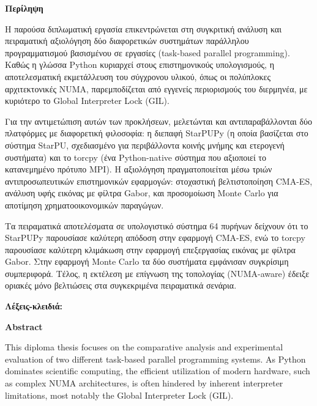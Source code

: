 \pagestyle{plain}
\begin{center}
{\LARGE \textbf{Περίληψη}}\\[1cm]
\end{center}

Η παρούσα διπλωματική εργασία επικεντρώνεται στη συγκριτική ανάλυση και πειραματική αξιολόγηση δύο διαφορετικών συστημάτων παράλληλου προγραμματισμού βασισμένου σε εργασίες (task-based parallel programming). Καθώς η γλώσσα Python κυριαρχεί στους επιστημονικούς υπολογισμούς, η αποτελεσματική εκμετάλλευση του σύγχρονου υλικού, όπως οι πολύπλοκες αρχιτεκτονικές NUMA, παρεμποδίζεται από εγγενείς περιορισμούς του διερμηνέα, με κυριότερο το Global Interpreter Lock (GIL).

Για την αντιμετώπιση αυτών των προκλήσεων, μελετώνται και αντιπαραβάλλονται δύο πλατφόρμες με διαφορετική φιλοσοφία: η διεπαφή StarPUPy (η οποία βασίζεται στο σύστημα StarPU, σχεδιασμένο για περιβάλλοντα κοινής μνήμης και ετερογενή συστήματα) και το torcpy (ένα Python-native σύστημα που αξιοποιεί το κατανεμημένο πρότυπο MPI). Η αξιολόγηση πραγματοποιείται μέσω τριών αντιπροσωπευτικών επιστημονικών εφαρμογών: στοχαστική βελτιστοποίηση CMA-ES, ανάλυση υφής εικόνας με φίλτρα Gabor, και προσομοίωση Monte Carlo για αποτίμηση χρηματοοικονομικών παραγώγων.

Τα πειραματικά αποτελέσματα σε υπολογιστικό σύστημα 64 πυρήνων δείχνουν ότι το StarPUPy παρουσίασε καλύτερη απόδοση στην εφαρμογή CMA-ES, ενώ το torcpy παρουσίασε καλύτερη κλιμάκωση στην εφαρμογή επεξεργασίας εικόνας με φίλτρα Gabor. Στην εφαρμογή Monte Carlo τα δύο συστήματα εμφάνισαν συγκρίσιμη συμπεριφορά. Τέλος, η εκτέλεση με επίγνωση της τοπολογίας (NUMA-aware) έδειξε οριακές μόνο βελτιώσεις στα συγκεκριμένα πειραματικά σενάρια.

\vfill
\noindent \textbf{Λέξεις-κλειδιά:} \keywordsgr

\clearemptydoublepage

\pagestyle{plain}
\begin{center}
{\LARGE \textbf{Abstract}}\\[1cm]
\end{center}

This diploma thesis focuses on the comparative analysis and experimental evaluation of two different task-based parallel programming systems. As Python dominates scientific computing, the efficient utilization of modern hardware, such as complex NUMA architectures, is often hindered by inherent interpreter limitations, most notably the Global Interpreter Lock (GIL).

